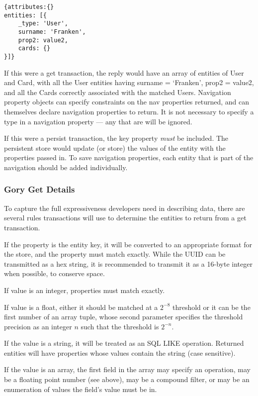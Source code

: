 \documentclass{article}
\renewcommand{\|}{\textbar}
\begin{document}
\linespread{1}
\begin{lstlisting}
{attributes:{}
entities: [{
	_type: 'User',
	surname: 'Franken',
	prop2: value2,
	cards: {}
}]}
\end{lstlisting}
\linespread{1.6}

If this were a {\ilcode get} transaction, the reply would have an array of
entities of {\ilcode User} and {\ilcode Card}, with all the {\ilcode User}
entities having {\ilcode surname = `Franken', prop2 = value2}, and all the
{\ilcode Card}s correctly associated with the matched Users.  Navigation
property objects can specify constraints on the nav properties returned, and
can themselves declare navigation properties to return. It is not necessary to
specify a type in a navigation property --- any that are will be ignored.

If this were a {\ilcode persist} transaction, the {\ilcode key} property {\it
must} be included. The persistent store would update (or store) the values of
the entity with the properties passed in. To save navigation properties, each
entity that is part of the navigation should be added individually.

\subsubsection{Gory Get Details}

To capture the full expressiveness developers need in describing data, there are
several rules transactions will use to determine the entities to return from a
{\ilcode get} transaction.

If the property is the entity key, it will be converted to an appropriate format
for the store, and the property must match exactly. While the UUID can be
transmitted as a hex string, it is recommended to transmit it as a 16-byte
integer when possible, to conserve space.

If value is an integer, properties must match exactly.

If value is a float, either it should be matched at a $2^{-8}$ threshold or it
can be the first number of an array tuple, whose second parameter specifies the
threshold precision as an integer $n$ such that the threshold is $2^{-n}$.

If the value is a string, it will be treated as an SQL LIKE operation. Returned
entities will have properties whose values contain the string (case sensitive).

If the value is an array, the first field in the array may specify an operation,
may be a floating point number (see above), may be a compound filter, or may be
an enumeration of values the field's value must be {\ilcode in}.
\end{document}
